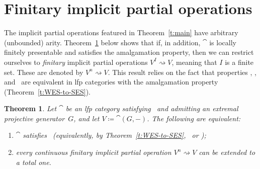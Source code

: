 \documentclass[a4paper,10pt,reqno]{amsart}
\newtheorem{theorem}{Theorem}[section]
\theoremstyle{definition}
\theoremstyle{remark}
\begin{document}
\section{Finitary implicit partial operations}\label{s:finitary-implicit-partial-operations}

The implicit partial operations featured in Theorem~\ref{t:main} have arbitrary (unbounded) arity. Theorem~\ref{t:SES-vs-implicit-operations-with-amalgam} below shows that if, in addition, $\cat$ is locally finitely presentable and satisfies the amalgamation property, then we can restrict ourselves to \emph{finitary} implicit partial operations $V^{I} \rightsquigarrow V$, meaning that $I$ is a finite set. These are denoted by $V^{n} \rightsquigarrow V$. This result relies on the fact that properties \WES, \ES, and \SES~are equivalent in lfp categories with the amalgamation property (Theorem~\ref{t:WES-to-SES}).
%

\begin{theorem}\label{t:SES-vs-implicit-operations-with-amalgam}
Let $\cat$ be an lfp category satisfying \AP~and admitting an extremal projective generator~$G$, and let $V\coloneqq \cat(G,-)$. The following are equivalent:
\begin{enumerate}[label=(\arabic*)]
\item\label{i:Cat-satisfies-SES-with-AP} $\cat$ satisfies \ES~(equivalently, by Theorem~\ref{t:WES-to-SES}, \WES~or \SES);
\item\label{i:continuous-finitary-admits-extension} every continuous finitary implicit partial operation $V^{n} \rightsquigarrow V$ can be extended to a total one.
\end{enumerate}
\end{theorem}
\end{document}
